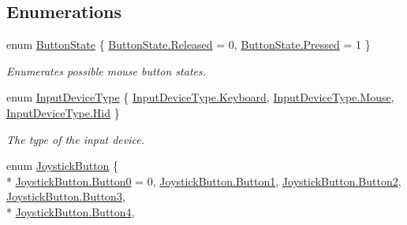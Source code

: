 \subsection*{Enumerations}
\begin{DoxyCompactItemize}
\item 
enum \hyperlink{namespace_open_t_k_1_1_input_a115b5677e3f8372e1c952fedc964d161}{Button\-State} \{ \hyperlink{namespace_open_t_k_1_1_input_a115b5677e3f8372e1c952fedc964d161aea1e34304a5d8ffa7c9b0ed8ede4ef1a}{Button\-State.\-Released} = 0, 
\hyperlink{namespace_open_t_k_1_1_input_a115b5677e3f8372e1c952fedc964d161ad78a68f6a85421ae121c2cb5b73a1040}{Button\-State.\-Pressed} = 1
 \}
\begin{DoxyCompactList}\small\item\em Enumerates possible mouse button states. \end{DoxyCompactList}\item 
enum \hyperlink{namespace_open_t_k_1_1_input_a1d147c6256b0adaa5288eec90ed93270}{Input\-Device\-Type} \{ \hyperlink{namespace_open_t_k_1_1_input_a1d147c6256b0adaa5288eec90ed93270a6ce4d85a628a88bbdb3ac24a8e5a9c2e}{Input\-Device\-Type.\-Keyboard}, 
\hyperlink{namespace_open_t_k_1_1_input_a1d147c6256b0adaa5288eec90ed93270af2a47c6809d88e175dade0ef7b16aa13}{Input\-Device\-Type.\-Mouse}, 
\hyperlink{namespace_open_t_k_1_1_input_a1d147c6256b0adaa5288eec90ed93270ad3616a0a736b5a3c4c73f7b177921e8b}{Input\-Device\-Type.\-Hid}
 \}
\begin{DoxyCompactList}\small\item\em The type of the input device. \end{DoxyCompactList}\item 
enum \hyperlink{namespace_open_t_k_1_1_input_a54204a11d897164a26ceff29ee03f3d3}{Joystick\-Button} \{ \\*
\hyperlink{namespace_open_t_k_1_1_input_a54204a11d897164a26ceff29ee03f3d3adf18fdbdb36feb48df7a2b683a732543}{Joystick\-Button.\-Button0} = 0, 
\hyperlink{namespace_open_t_k_1_1_input_a54204a11d897164a26ceff29ee03f3d3a6475a3746209a62a6ce6289a3741d07e}{Joystick\-Button.\-Button1}, 
\hyperlink{namespace_open_t_k_1_1_input_a54204a11d897164a26ceff29ee03f3d3ae165925a7c2d5ea94209b91389aa189f}{Joystick\-Button.\-Button2}, 
\hyperlink{namespace_open_t_k_1_1_input_a54204a11d897164a26ceff29ee03f3d3a6d0c69e60d65a93dd244ae95f90e679c}{Joystick\-Button.\-Button3}, 
\\*
\hyperlink{namespace_open_t_k_1_1_input_a54204a11d897164a26ceff29ee03f3d3a91ff24acfc01cc2c3a4238a272a37d07}{Joystick\-Button.\-Button4}, 

\end{DoxyCompactItemize}
